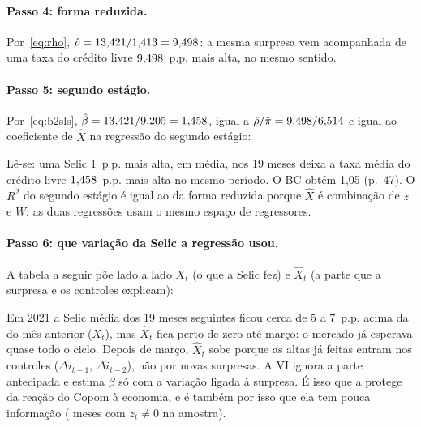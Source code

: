 \paragraph{Passo 4: forma reduzida.} Por~\eqref{eq:rho}, $\hat\rho=13{,}421/1{,}413=9{,}498$: a mesma
surpresa vem acompanhada de uma taxa do crédito livre $9{,}498$~p.p. mais alta, no mesmo sentido.
\begin{table}[H]\centering\small
\caption{Forma reduzida, equação~\eqref{eq:rf}: $Y^{18}_t$ na surpresa e nos controles}

\end{table}

\paragraph{Passo 5: segundo estágio.} Por~\eqref{eq:b2sls}, $\hat\beta=13{,}421/9{,}205=1{,}458$, igual
a $\hat\rho/\hat\pi=9{,}498/6{,}514$ e igual ao coeficiente de $\widehat X$ na regressão do
segundo estágio:
\begin{table}[H]\centering\small
\caption{Segundo estágio, equação~\eqref{eq:ss}: $Y^{18}_t$ no valor previsto e nos controles}

\end{table}
Lê-se: uma Selic 1~p.p. mais alta, em média, nos 19 meses deixa a taxa média do crédito livre
$1{,}458$~p.p. mais alta no mesmo período. O BC obtém 1,05 (p.~47). O $R^2$ do segundo estágio é
igual ao da forma reduzida porque $\widehat X$ é combinação de $z$ e $W$: as duas regressões usam o
mesmo espaço de regressores.

\paragraph{Passo 6: que variação da Selic a regressão usou.} A tabela a seguir põe lado a lado
$X_t$ (o que a Selic fez) e $\widehat X_t$ (a parte que a surpresa e os controles explicam):
\begin{table}[H]\centering\small
\caption{O que entra em cada regressão, em volta do início do ciclo de alta de 2021}
\resizebox{\textwidth}{!}{}
\end{table}
Em 2021 a Selic média dos 19 meses seguintes ficou cerca de 5 a 7~p.p. acima da do mês anterior
($X_t$), mas $\widehat X_t$ fica perto de zero até março: o mercado já esperava quase todo o ciclo.
Depois de março, $\widehat X_t$ sobe porque as altas já feitas entram nos controles
($\Delta i_{t-1}$, $\Delta i_{t-2}$), não por novas surpresas. A VI ignora a parte antecipada e
estima $\beta$ só com a variação ligada à surpresa. É isso que a protege da reação do
Copom à economia, e é também por isso que ela tem pouca informação (\Nmesessurp{} meses com
$z_t\neq0$ na amostra).

